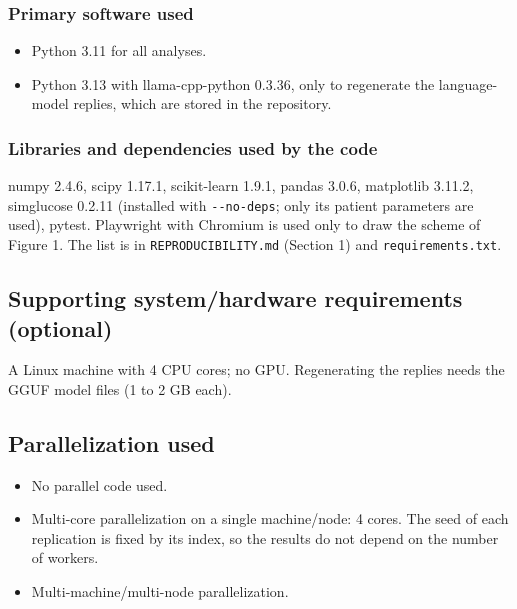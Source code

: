 \documentclass[11pt]{article}
\providecommand{\tightlist}{\setlength{\itemsep}{0pt}\setlength{\parskip}{0pt}}
\begin{document}
\hypertarget{primary-software-used}{%
\subsubsection{Primary software used}\label{primary-software-used}}

\begin{itemize}
\tightlist
\item
  Python 3.11 for all analyses.
\item
  Python 3.13 with llama-cpp-python 0.3.36, only to regenerate the
  language-model replies, which are stored in the repository.
\end{itemize}

\hypertarget{libraries-and-dependencies-used-by-the-code}{%
\subsubsection{Libraries and dependencies used by the
code}\label{libraries-and-dependencies-used-by-the-code}}

numpy 2.4.6, scipy 1.17.1, scikit-learn 1.9.1, pandas 3.0.6, matplotlib
3.11.2, simglucose 0.2.11 (installed with \texttt{-\/-no-deps}; only its
patient parameters are used), pytest. Playwright with Chromium is used
only to draw the scheme of Figure 1. The list is in
\texttt{REPRODUCIBILITY.md} (Section 1) and \texttt{requirements.txt}.

\hypertarget{supporting-systemhardware-requirements-optional}{%
\subsection{Supporting system/hardware requirements
(optional)}\label{supporting-systemhardware-requirements-optional}}

A Linux machine with 4 CPU cores; no GPU. Regenerating the replies needs
the GGUF model files (1 to 2 GB each).

\hypertarget{parallelization-used}{%
\subsection{Parallelization used}\label{parallelization-used}}

\begin{itemize}
\tightlist
\item[$\square$]
  No parallel code used.
\item[$\boxtimes$]
  Multi-core parallelization on a single machine/node: 4 cores. The seed
  of each replication is fixed by its index, so the results do not
  depend on the number of workers.
\item[$\square$]
  Multi-machine/multi-node parallelization.
\end{itemize}
\end{document}
